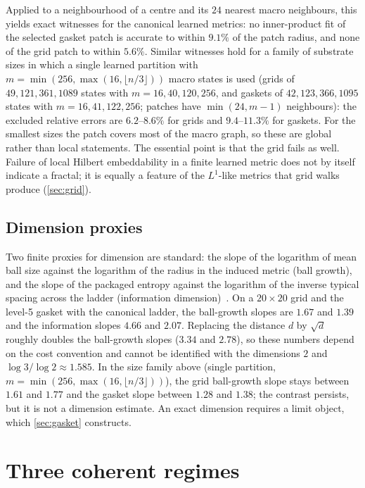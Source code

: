\documentclass[11pt]{article}
\begin{document}
Applied to a neighbourhood of a centre and its $24$ nearest macro neighbours, this yields exact witnesses for the canonical learned metrics: no inner-product fit of the selected gasket patch is accurate to within $9.1\%$ of the patch radius, and none of the grid patch to within $5.6\%$.
Similar witnesses hold for a family of substrate sizes in which a single learned partition with $m=\min(256,\max(16,\lfloor n/3\rfloor))$ macro states is used (grids of $49,121,361,1089$ states with $m=16,40,120,256$, and gaskets of $42,123,366,1095$ states with $m=16,41,122,256$; patches have $\min(24,m-1)$ neighbours): the excluded relative errors are $6.2$--$8.6\%$ for grids and $9.4$--$11.3\%$ for gaskets. For the smallest sizes the patch covers most of the macro graph, so these are global rather than local statements.
The essential point is that the grid fails as well.
Failure of local Hilbert embeddability in a finite learned metric does not by itself indicate a fractal; it is equally a feature of the $L^1$-like metrics that grid walks produce (\cref{sec:grid}).

\subsection{Dimension proxies}

Two finite proxies for dimension are standard: the slope of the logarithm of mean ball size against the logarithm of the radius in the induced metric (ball growth), and the slope of the packaged entropy against the logarithm of the inverse typical spacing across the ladder (information dimension)~\cite{Renyi1959DimensionEntropy,CoverThomas2006,Falconer2003Fractal}.
On a $20\times20$ grid and the level-5 gasket with the canonical ladder, the ball-growth slopes are $1.67$ and $1.39$ and the information slopes $4.66$ and $2.07$.
Replacing the distance $d$ by $\sqrt d$ roughly doubles the ball-growth slopes ($3.34$ and $2.78$), so these numbers depend on the cost convention and cannot be identified with the dimensions $2$ and $\log3/\log2\approx1.585$.
In the size family above (single partition, $m=\min(256,\max(16,\lfloor n/3\rfloor))$), the grid ball-growth slope stays between $1.61$ and $1.77$ and the gasket slope between $1.28$ and $1.38$; the contrast persists, but it is not a dimension estimate.
An exact dimension requires a limit object, which \cref{sec:gasket} constructs.
 \section{Three coherent regimes}
\label{sec:constructed}
\end{document}
